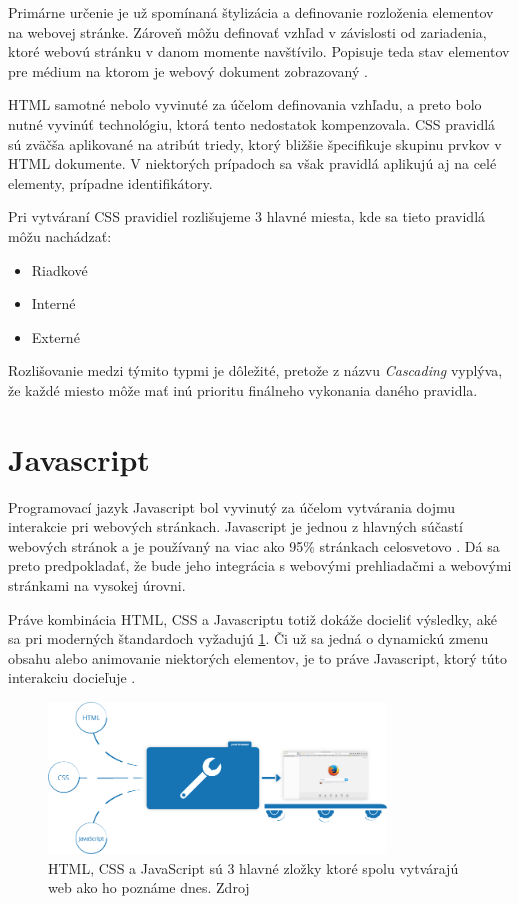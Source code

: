 Primárne určenie je už spomínaná štylizácia a definovanie rozloženia elementov na webovej stránke. Zároveň môžu definovať vzhľad v závislosti od zariadenia, ktoré webovú stránku v danom momente navštívilo. Popisuje teda stav elementov pre médium na ktorom je webový dokument zobrazovaný \cite{CSS}. 

HTML samotné nebolo vyvinuté za účelom definovania vzhľadu, a preto bolo nutné vyvinúť technológiu, ktorá tento nedostatok kompenzovala. CSS pravidlá sú zväčša aplikované na atribút triedy, ktorý bližšie špecifikuje skupinu prvkov v HTML dokumente. V niektorých prípadoch sa však pravidlá aplikujú aj na celé elementy, prípadne identifikátory.

Pri vytváraní CSS pravidiel rozlišujeme 3 hlavné miesta, kde sa tieto pravidlá môžu nachádzať:

\begin{itemize}
    \item {Riadkové}
    \item {Interné}
    \item {Externé}
\end{itemize}

Rozlišovanie medzi týmito typmi je dôležité, pretože z názvu \textit{Cascading} vyplýva, že každé miesto môže mať inú prioritu finálneho vykonania daného pravidla.

\section{Javascript}

Programovací jazyk Javascript bol vyvinutý za účelom vytvárania dojmu interakcie pri webových stránkach. Javascript je jednou z hlavných súčastí webových stránok a je používaný na viac ako 95\% stránkach celosvetovo \cite{HowPopular}. Dá sa preto predpokladať, že bude jeho integrácia s webovými prehliadačmi a webovými stránkami na vysokej úrovni. 

\bigskip

Práve kombinácia HTML, CSS a Javascriptu totiž dokáže docieliť výsledky, aké sa pri moderných štandardoch vyžadujú \ref{Jsexecution_img}. Či už sa jedná o dynamickú zmenu obsahu alebo animovanie niektorých elementov, je to práve Javascript, ktorý túto interakciu docieľuje \cite{Javascript}. 

\newpage
\begin{figure}[hbt]
	\centering
	\includegraphics[width=0.8\textwidth]{obrazky-figures/jsexecution.png}
	\caption{HTML, CSS a JavaScript sú 3 hlavné zložky ktoré spolu vytvárajú web ako ho poznáme dnes. Zdroj \cite{Javascript}}
	\label{Jsexecution_img}
\end{figure}

